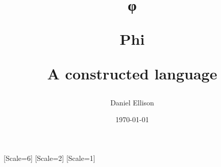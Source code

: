 [Scale=6]
[Scale=2]
[Scale=1]

\title
{
  \largelogo \hspace{0em} φ
  \setlength{\parskip}{0.4em}

  \titlefont Phi
  \setlength{\parskip}{0.1em}

  \subtitlefont A constructed language
}
\author{Daniel Ellison}
\date{\today}
\maketitle
